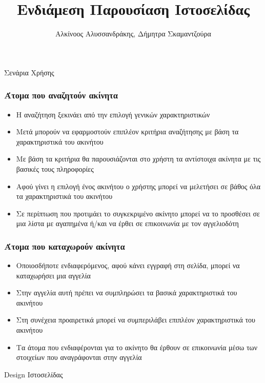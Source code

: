\documentclass{beamer}
\title{Ενδιάμεση Παρουσίαση Ιστοσελίδας}
\author{Αλκίνοος Αλυσσανδράκης, Δήμητρα Σκαμαντζούρα}
\date{}
\begin{document}
\frame{\titlepage}

\begin{frame}
	\begin{center}
		{\fontsize{20}{50}\selectfont Σενάρια Χρήσης}
	\end{center}
\end{frame}

\begin{frame}
	\frametitle{Άτομα που αναζητούν ακίνητα}
	\begin{itemize}
		\item Η αναζήτηση ξεκινάει από την επιλογή γενικών χαρακτηριστικών
		\item Μετά μπορούν να εφαρμοστούν επιπλέον κριτήρια αναζήτησης με βάση τα χαρακτηριστικά του ακινήτου
		\item Με βάση τα κριτήρια θα παρουσιάζονται στο χρήστη τα αντίστοιχα ακίνητα με τις βασικές τους πληροφορίες
		\item Αφού γίνει η επιλογή ένος ακινήτου ο χρήστης μπορεί να μελετήσει σε βάθος όλα τα χαρακτηριστικά του ακινήτου
		\item Σε περίπτωση που προτιμάει το συγκεκριμένο ακίνητο μπορεί να το προσθέσει σε μια λίστα με αγαπημένα ή/και να έρθει σε επικοινωνία με τον αγγελιοδότη
	\end{itemize}
\end{frame}

\begin{frame}
	\frametitle{Άτομα που καταχωρούν ακίνητα}
	\begin{itemize}
		\item Οποιοσδήποτε ενδιαφερόμενος, αφού κάνει εγγραφή στη σελίδα, μπορεί να καταχωρήσει μια αγγελία
		\item Στην αγγελία αυτή πρέπει να συμπληρώσει τα βασικά χαρακτηριστικά του ακινήτου
		\item Στη συνέχεια προαιρετικά μπορεί να συμπεριλάβει επιπλέον χαρακτηριστικά του ακινήτου
		\item Τα άτομα που ενδιαφέρονται για το ακίνητο θα έρθουν σε επικοινωνία μέσω των στοιχείων που αναγράφονται στην αγγελία
	\end{itemize}
\end{frame}

\begin{frame}
	\begin{center}
		{\fontsize{20}{50}\selectfont Design Ιστοσελίδας}
	\end{center}
\end{frame}
\end{document}
